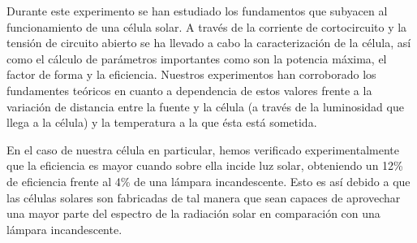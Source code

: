 Durante este experimento se han estudiado los fundamentos que subyacen al funcionamiento de una célula solar. A través de la corriente de cortocircuito y la tensión de circuito abierto se ha llevado a cabo la caracterización de la célula, así como el cálculo de parámetros importantes como son la potencia máxima, el factor de forma y la eficiencia. Nuestros experimentos han corroborado los fundamentes teóricos en cuanto a dependencia de estos valores frente a la variación de distancia entre la fuente y la célula (a través de la luminosidad que llega a la célula) y la temperatura a la que ésta está sometida.

En el caso de nuestra célula en particular, hemos verificado experimentalmente que la eficiencia es mayor cuando sobre ella incide luz solar, obteniendo un 12\% de eficiencia frente al 4\% de una lámpara incandescente. Esto es así debido a que las células solares son fabricadas de tal manera que sean capaces de aprovechar una mayor parte del espectro de la radiación solar en comparación con una lámpara incandescente.